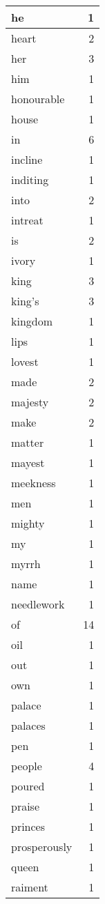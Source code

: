 \begin{center}
\begin{longtable}{l|r}
he & 1\\ \hline 
heart & 2\\ \hline 
her & 3\\ \hline 
him & 1\\ \hline 
honourable & 1\\ \hline 
house & 1\\ \hline 
in & 6\\ \hline 
incline & 1\\ \hline 
inditing & 1\\ \hline 
into & 2\\ \hline 
intreat & 1\\ \hline 
is & 2\\ \hline 
ivory & 1\\ \hline 
king & 3\\ \hline 
king's & 3\\ \hline 
kingdom & 1\\ \hline 
lips & 1\\ \hline 
lovest & 1\\ \hline 
made & 2\\ \hline 
majesty & 2\\ \hline 
make & 2\\ \hline 
matter & 1\\ \hline 
mayest & 1\\ \hline 
meekness & 1\\ \hline 
men & 1\\ \hline 
mighty & 1\\ \hline 
my & 1\\ \hline 
myrrh & 1\\ \hline 
name & 1\\ \hline 
needlework & 1\\ \hline 
of & 14\\ \hline 
oil & 1\\ \hline 
out & 1\\ \hline 
own & 1\\ \hline 
palace & 1\\ \hline 
palaces & 1\\ \hline 
pen & 1\\ \hline 
people & 4\\ \hline 
poured & 1\\ \hline 
praise & 1\\ \hline 
princes & 1\\ \hline 
prosperously & 1\\ \hline 
queen & 1\\ \hline 
raiment & 1\\ \hline 

\end{longtable}
\end{center}
